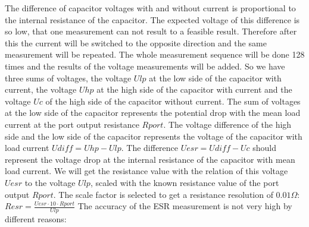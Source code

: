 The difference of capacitor voltages with and without current is proportional to the internal resistance of the capacitor. 
The expected voltage of this difference is so low, that one measurement can not result to a feasible result.
Therefore after this the current will be switched to the opposite direction and the same measurement will be repeated.
The whole measurement sequence will be done 128 times and the results of the voltage measurements will be added.
So we have three sums of voltages, the voltage \(Ulp\) at the low side of the capacitor with current, the voltage \(Uhp\) at
the high side of the capacitor with current and the voltage \(Uc\) of the high side of the capacitor without current.
The sum of voltages at the low side of the capacitor represents the potential drop with the mean load current at
the port output resistance \(Rport\). 
The voltage difference  of the high side and the low side of the capacitor represents the voltage of the capacitor with
load current \(Udiff = Uhp - Ulp\).
The difference \(Uesr = Udiff - Uc\) should represent the voltage drop at the internal resistance of the capacitor with
mean load current.
We will get the resistance value with the relation of this voltage \(Uesr\) to the voltage \(Ulp\), scaled with the
known resistance value of the port output \(Rport\).
The scale factor is selected to get a resistance resolution of \(0.01 \Omega\):  \(Resr = \frac{Uesr \cdot 10 \cdot Rport}{Ulp}\)
The accuracy of the ESR measurement is not very high by different reasons:

